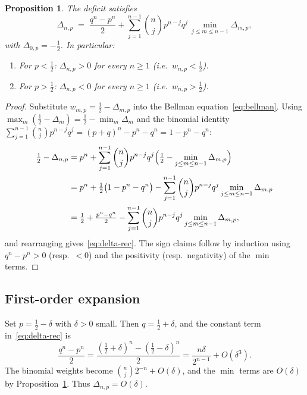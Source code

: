 \documentclass[12pt]{article}
\newtheorem{proposition}[theorem]{Proposition}
\theoremstyle{definition}
\theoremstyle{remark}
\begin{document}
\begin{proposition}\label{prop:delta-rec}
  The deficit satisfies
  \begin{equation}\label{eq:delta-rec}
    \Delta_{n,p} \;=\;
    \frac{q^n-p^n}{2}
    + \sum_{j=1}^{n-1}\binom{n}{j}p^{n-j}q^{j}\,
    \min_{j\le m\le n-1}\Delta_{m,p},
  \end{equation}
  with $\Delta_{0,p}=-\tfrac12$.
  In particular:
  \begin{enumerate}[\rm(i)]
  \item For $p<\tfrac12$: $\Delta_{n,p}>0$ for every $n\ge 1$
    (i.e.\ $w_{n,p}<\tfrac12$).
  \item For $p>\tfrac12$: $\Delta_{n,p}<0$ for every $n\ge 1$
    (i.e.\ $w_{n,p}>\tfrac12$).
  \end{enumerate}
\end{proposition}

\begin{proof}
  Substitute $w_{m,p}=\tfrac12-\Delta_{m,p}$ into the
  Bellman equation~\eqref{eq:bellman}.  Using
  $\max_m(\tfrac12-\Delta_m) = \tfrac12 - \min_m\Delta_m$ and the
  binomial identity $\sum_{j=1}^{n-1}\binom{n}{j}p^{n-j}q^j
  = (p+q)^n - p^n - q^n = 1 - p^n - q^n$:
  \begin{align*}
    \tfrac12 - \Delta_{n,p}
    &= p^n + \sum_{j=1}^{n-1}\binom{n}{j}p^{n-j}q^j
       \Bigl(\tfrac12 - \min_{j\le m\le n-1}\Delta_{m,p}\Bigr) \\
    &= p^n + \tfrac12\bigl(1 - p^n - q^n\bigr)
       - \sum_{j=1}^{n-1}\binom{n}{j}p^{n-j}q^j\min_{j\le m\le n-1}\Delta_{m,p} \\
    &= \tfrac12 + \tfrac{p^n - q^n}{2}
       - \sum_{j=1}^{n-1}\binom{n}{j}p^{n-j}q^j\min_{j\le m\le n-1}\Delta_{m,p},
  \end{align*}
  and rearranging gives~\eqref{eq:delta-rec}.
  The sign claims follow by induction using $q^n-p^n>0$ (resp.\ $<0$)
  and the positivity (resp.\ negativity) of the $\min$ terms.
\end{proof}

\subsection{First-order expansion}

Set $p=\tfrac12-\delta$ with $\delta>0$ small.  Then
$q=\tfrac12+\delta$, and the constant term in~\eqref{eq:delta-rec} is
\[
  \frac{q^n-p^n}{2}
  = \frac{(\tfrac12+\delta)^n-(\tfrac12-\delta)^n}{2}
  = \frac{n\delta}{2^{n-1}} + O(\delta^3).
\]
The binomial weights become $\binom{n}{j}2^{-n}+O(\delta)$, and the
$\min$ terms are $O(\delta)$ by Proposition~\ref{prop:delta-rec}.
Thus $\Delta_{n,p}=O(\delta)$.
\end{document}
